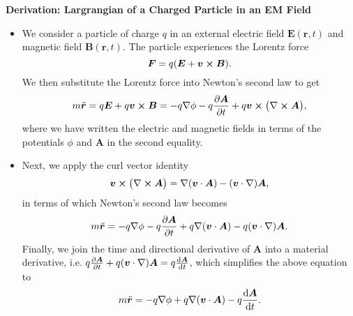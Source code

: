 \documentclass[11pt, a4paper]{article}
\renewcommand{\vec}[1]{\bm{#1}} %
\renewcommand{\r}{\vec{r}}
\newcommand{\E}{\vec{E}} %
\newcommand{\B}{\vec{B}} %
\newcommand{\A}{\vec{A}} %
\renewcommand{\curl}{\nabla \cross}
\renewcommand{\grad}{\nabla}
\begin{document}
\textbf{Derivation: Largrangian of a Charged Particle in an EM Field}
\begin{itemize}
    \item We consider a particle of charge $ q $ in an external electric field $ \E(\r, t) $ and magnetic field $ \B(\r, t) $. The particle experiences the Lorentz force
    \begin{equation*}
        \vec{F} = q(\E + \vec{v}\cross \B).
    \end{equation*}
    We then substitute the Lorentz force into Newton's second law to get
    \begin{equation*}
        m \ddot{\vec{r}} = q\E + q \vec{v} \cross \B = - q\grad \phi - q \pdv{\A}{t} + q \vec{v}\cross \big( \curl \A \big),
    \end{equation*}
    where we have written the electric and magnetic fields in terms of the potentials $ \phi $ and $ \A $ in the second equality.

    \item Next, we apply the curl vector identity
    \begin{equation*}
        \vec{v}\cross \big( \curl \A \big) = \grad ( \vec{v}\cdot \A) - ( \vec{v}\cdot \grad)\A,
    \end{equation*}
    in terms of which Newton's second law becomes
    \begin{equation*}
        m \ddot{\vec{r}} = - q \grad \phi - q \pdv{\A}{t} + q \grad ( \vec{v}\cdot \A) - q( \vec{v} \cdot \grad)\A.
    \end{equation*}
    Finally, we join the time and directional derivative of $ \A $ into a material derivative, i.e. $ q \pdv{\A}{t} + q(\vec{v}\cdot \grad)\A = q \dv{\A}{t}$, which simplifies the above equation to
    \begin{equation*}
        m \ddot{\vec{r}} = -q \grad \phi + q \grad ( \vec{v} \cdot \A) - q \dv{\A}{t}.
    \end{equation*}
    

\end{itemize}
\end{document}
